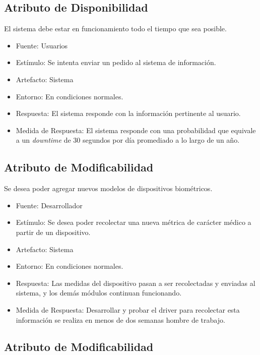 \subsection{Atributo de Disponibilidad}

El sistema debe estar en funcionamiento todo el tiempo que sea posible.

\begin{itemize}
\itemsep1pt\parskip0pt
\item
  Fuente: Usuarios
\item
  Estímulo: Se intenta enviar un pedido al sistema de información.
\item
  Artefacto: Sistema
\item
  Entorno: En condiciones normales.
\item
  Respuesta: El sistema responde con la información pertinente al
  usuario.
\item
  Medida de Respuesta: El sistema responde con una probabilidad que
  equivale a un \emph{downtime} de 30 segundos por día promediado a lo
  largo de un año.
\end{itemize}

\subsection{Atributo de Modificabilidad}

Se desea poder agregar nuevos modelos de dispositivos biométricos.

\begin{itemize}
\itemsep1pt\parskip0pt
\item
  Fuente: Desarrollador
\item
  Estímulo: Se desea poder recolectar una nueva métrica de carácter
  médico a partir de un dispositivo.
\item
  Artefacto: Sistema
\item
  Entorno: En condiciones normales.
\item
  Respuesta: Las medidas del dispositivo pasan a ser recolectadas y
  enviadas al sistema, y los demás módulos continuan funcionando.
\item
  Medida de Respuesta: Desarrollar y probar el driver para recolectar
  esta información se realiza en menos de dos semanas hombre de trabajo.
\end{itemize}

\subsection{Atributo de Modificabilidad}

